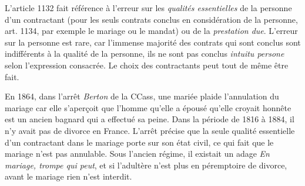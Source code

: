 \documentclass[math]{cours}
\begin{document}
L'article 1132 fait référence à l'erreur sur les \emph{qualités essentielles} de la personne d'un contractant (pour les seuls contrats conclus en considération de la personne, art. 1134, par exemple le mariage ou le mandat) ou de la \emph{prestation due}.
L'erreur sur la personne est rare, car l'immense majorité des contrats qui sont conclus sont indifférents à la qualité de la personne, ils ne sont pas conclus \emph{intuitu persone} selon l'expression consacrée.
Le choix des contractants peut tout de même être fait.

En 1864, dans l'arrêt \emph{Berton} de la CCass, une mariée plaide l'annulation du mariage car elle s'aperçoit que l'homme qu'elle a épousé qu'elle croyait honnête est un ancien bagnard qui a effectué sa peine.
Dans la période de 1816 à 1884, il n'y avait pas de divorce en France.
L'arrêt précise que la seule qualité essentielle d'un contractant dans le mariage porte sur son état civil, ce qui fait que le mariage n'est pas annulable.
Sous l'ancien régime, il existait un adage \emph{En mariage, trompe qui peut}, et si l'adultère n'est plus en péremptoire de divorce, avant le mariage rien n'est interdit.
\end{document}

